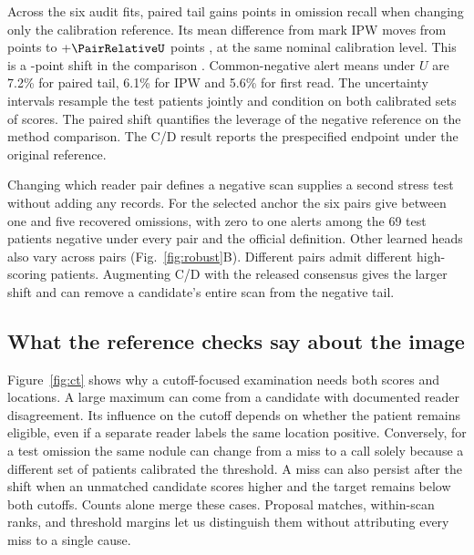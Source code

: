 Across the six audit fits, paired tail gains \PairChange{} points \PairChangeCI{} in omission recall when changing only the calibration reference. Its mean difference from mark IPW moves from \PairRelativeP{} points \PairRelativePCI{} to $+\PairRelativeU$ points \PairRelativeUCI{}, at the same nominal calibration level. This is a \ReferenceInteraction{}-point shift in the comparison \ReferenceInteractionCI{}. Common-negative alert means under $U$ are 7.2\% for paired tail, 6.1\% for IPW and 5.6\% for first read. The uncertainty intervals resample the test patients jointly and condition on both calibrated sets of scores. The paired shift quantifies the leverage of the negative reference on the method comparison. The C/D result reports the prespecified endpoint under the original reference.

Changing which reader pair defines a negative scan supplies a second stress test without adding any records. For the selected anchor the six pairs give between one and five recovered omissions, with zero to one alerts among the 69 test patients negative under every pair and the official definition. Other learned heads also vary across pairs (Fig.~\ref{fig:robust}B). Different pairs admit different high-scoring patients. Augmenting C/D with the released consensus gives the larger shift and can remove a candidate's entire scan from the negative tail.
\subsection{What the reference checks say about the image}

Figure~\ref{fig:ct} shows why a cutoff-focused examination needs both scores and locations. A large maximum can come from a candidate with documented reader disagreement. Its influence on the cutoff depends on whether the patient remains eligible, even if a separate reader labels the same location positive. Conversely, for a test omission the same nodule can change from a miss to a call solely because a different set of patients calibrated the threshold. A miss can also persist after the shift when an unmatched candidate scores higher and the target remains below both cutoffs. Counts alone merge these cases. Proposal matches, within-scan ranks, and threshold margins let us distinguish them without attributing every miss to a single cause.
